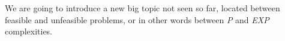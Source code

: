 We are going to introduce a new big topic not seen so far, located between feasible and unfeasible problems, or in other words between \textit{P} and \textit{EXP}
complexities.
